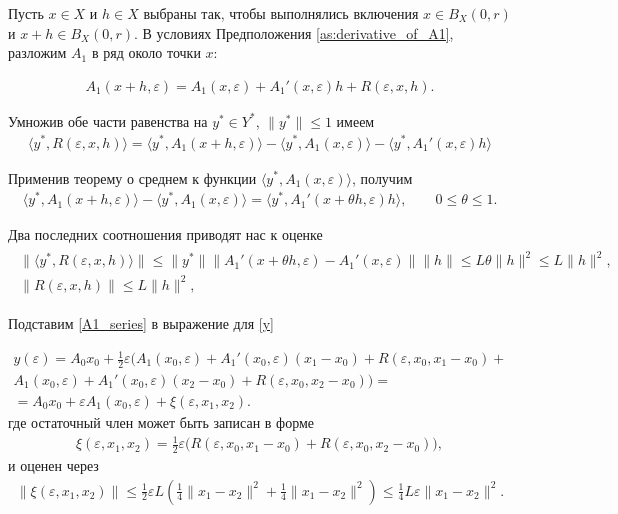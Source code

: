 \documentclass[../main.tex]{subfiles}
\begin{document}
Пусть $x \in X$ и $h \in X$ выбраны так, чтобы выполнялись включения $x\in B_X(0, r)$ и $x+h \in B_X(0, r)$.
В условиях Предположения \ref{as:derivative_of_A1}, разложим $A_1$ в ряд около точки $x$:

\begin{gather}\label{A1_series}
 A_1(x + h,\varepsilon) = A_1(x,\varepsilon) + A_1'(x,\varepsilon) h + R(\varepsilon, x, h).
\end{gather}

Умножив обе части равенства на $y^* \in Y^*$, $\|y^*\| \leqslant 1$ имеем
\begin{gather*}
 \langle y^*, R(\varepsilon, x, h) \rangle = 
 \langle y^*, A_1(x + h,\varepsilon) \rangle -
 \langle y^*, A_1(x,\varepsilon) \rangle -
 \langle y^*, A_1'(x,\varepsilon) h \rangle
\end{gather*}

Применив теорему о среднем к функции $\langle y^*, A_1(x,\varepsilon) \rangle$, получим
\begin{gather*}
 \langle y^*, A_1(x + h,\varepsilon) \rangle -
 \langle y^*, A_1(x,\varepsilon) \rangle = 
 \langle y^*, A_1'(x + \theta h,\varepsilon) h \rangle,
 \qquad
 0 \leqslant \theta \leqslant 1.
\end{gather*}

Два последних соотношения приводят нас к оценке
\begin{gather}
 \begin{gathered}
 \|\langle y^*, R(\varepsilon, x, h) \rangle \| \leqslant
 \| y^* \| 
 \| A_1'(x + \theta h,\varepsilon) -
 A_1'(x,\varepsilon) \| 
 \| h \| \leqslant 
 L \theta \|h\|^2 \leqslant
 L \|h\|^2, \\
 \| R(\varepsilon, x, h) \| \leqslant
 L \|h\|^2, 
 \end{gathered}
\end{gather}

Подставим \eqref{A1_series} в выражение для \eqref{y}

\begin{gather*}
 y(\varepsilon) =
 A_0x_0 +
 \frac{1}{2}\varepsilon \Big(
 A_1(x_0,\varepsilon) +
 A_1'(x_0,\varepsilon)(x_1 - x_0)+ 
 R(\varepsilon, x_0, x_1 - x_0) + \\ 
 A_1(x_0,\varepsilon) +
 A_1'(x_0,\varepsilon)(x_2 - x_0)+ 
 R(\varepsilon, x_0, x_2 - x_0)
 \Big) = \\ = 
 A_0x_0 + 
 \varepsilon A_1(x_0,\varepsilon) +
 \xi(\varepsilon,x_1,x_2).
\end{gather*}
где остаточный член может быть записан в форме
\begin{gather*}
 \xi(\varepsilon,x_1,x_2) = \frac{1}{2}\varepsilon\big(R(\varepsilon, x_0, x_1 - x_0) + R(\varepsilon, x_0, x_2 - x_0)\big),
\end{gather*}
и оценен через
\begin{gather*}
 \|\xi(\varepsilon,x_1,x_2)\| \leqslant \frac{1}{2}\varepsilon L \left(\frac{1}{4}\|x_1 - x_2\|^2 + \frac{1}{4}\|x_1 - x_2\|^2 \right) \leqslant \frac{1}{4}L\varepsilon\|x_1 - x_2\|^2. 
\end{gather*}
\end{document}
